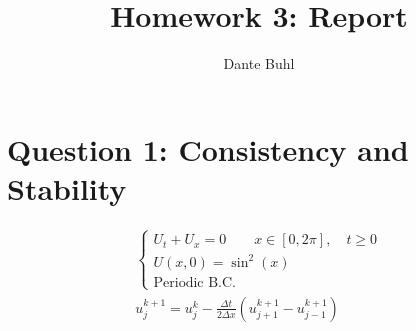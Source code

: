 \documentclass{article}
\title{Homework 3: Report}
\author{Dante Buhl}
\begin{document}
\newcommand{\bs}[1]{\boldsymbol{#1}}
\newcommand{\bmp}[1]{\begin{minipage}{#1\textwidth}}
\newcommand{\emp}{\end{minipage}}
\newcommand{\R}{\mathbb{R}}
\newcommand{\C}{\mathbb{C}}
\newcommand{\N}{\mathcal{N}}
\newcommand{\I}{\mathrm{I}}
\newcommand{\K}{\bs{\mathrm{K}}}
\newcommand{\m}{\bs{\mu}_*}
\newcommand{\s}{\bs{\Sigma}_*}
\newcommand{\dt}{\Delta t}
\newcommand{\dx}{\Delta x}
\newcommand{\tr}[1]{\text{Tr}(#1)}
\newcommand{\Tr}[1]{\text{Tr}(#1)}
\newcommand{\pd}[2]{\frac{\partial #1}{\partial #2}}

\maketitle

\section*{Question 1: Consistency and Stability}
    \begin{align}
        \begin{cases}
            U_t + U_x = 0 \quad \quad x \in [0, 2\pi],
            \quad t \ge 0\\
            U(x,0) = \sin^2(x)\\
            \text{Periodic B.C.}
        \end{cases} \\
        u_j^{k+1} = u_j^k - \frac{\dt}{2\dx}(u_{j+1}^{k+1} - u_{j-1}^{k+1})
    \end{align}
\end{document}
